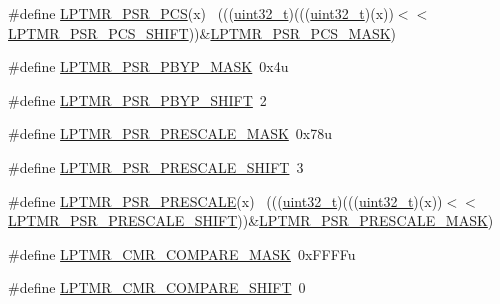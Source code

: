 \begin{DoxyCompactItemize}
\#define \hyperlink{group___l_p_t_m_r___register___masks_ga6b5b85beaa5760eaa1b5e0fd252bf9a2}{L\+P\+T\+M\+R\+\_\+\+P\+S\+R\+\_\+\+P\+CS}(x)                                              ~(((\hyperlink{_p_e___types_8h_a33594304e786b158f3fb30289278f5af}{uint32\+\_\+t})(((\hyperlink{_p_e___types_8h_a33594304e786b158f3fb30289278f5af}{uint32\+\_\+t})(x))$<$$<$\hyperlink{group___l_p_t_m_r___register___masks_gaf258bce874ad60601d6d76cefc72c52e}{L\+P\+T\+M\+R\+\_\+\+P\+S\+R\+\_\+\+P\+C\+S\+\_\+\+S\+H\+I\+FT}))\&\hyperlink{group___l_p_t_m_r___register___masks_ga40daa10db43ec0c0a1944e6289ca29cc}{L\+P\+T\+M\+R\+\_\+\+P\+S\+R\+\_\+\+P\+C\+S\+\_\+\+M\+A\+SK})
\item 
\#define \hyperlink{group___l_p_t_m_r___register___masks_gab3daae6085cf702b31db5be78fe03872}{L\+P\+T\+M\+R\+\_\+\+P\+S\+R\+\_\+\+P\+B\+Y\+P\+\_\+\+M\+A\+SK}~0x4u
\item 
\#define \hyperlink{group___l_p_t_m_r___register___masks_ga4bb5021e396db697f5e597fdcdc222e3}{L\+P\+T\+M\+R\+\_\+\+P\+S\+R\+\_\+\+P\+B\+Y\+P\+\_\+\+S\+H\+I\+FT}~2
\item 
\#define \hyperlink{group___l_p_t_m_r___register___masks_ga93a6fe3fb169a73716a837cedb92dbef}{L\+P\+T\+M\+R\+\_\+\+P\+S\+R\+\_\+\+P\+R\+E\+S\+C\+A\+L\+E\+\_\+\+M\+A\+SK}~0x78u
\item 
\#define \hyperlink{group___l_p_t_m_r___register___masks_ga7ed76902e13634d0c543ade3ef47525a}{L\+P\+T\+M\+R\+\_\+\+P\+S\+R\+\_\+\+P\+R\+E\+S\+C\+A\+L\+E\+\_\+\+S\+H\+I\+FT}~3
\item 
\#define \hyperlink{group___l_p_t_m_r___register___masks_gaeb71c6e1dd5200d74099db29087a59e3}{L\+P\+T\+M\+R\+\_\+\+P\+S\+R\+\_\+\+P\+R\+E\+S\+C\+A\+LE}(x)                                    ~(((\hyperlink{_p_e___types_8h_a33594304e786b158f3fb30289278f5af}{uint32\+\_\+t})(((\hyperlink{_p_e___types_8h_a33594304e786b158f3fb30289278f5af}{uint32\+\_\+t})(x))$<$$<$\hyperlink{group___l_p_t_m_r___register___masks_ga7ed76902e13634d0c543ade3ef47525a}{L\+P\+T\+M\+R\+\_\+\+P\+S\+R\+\_\+\+P\+R\+E\+S\+C\+A\+L\+E\+\_\+\+S\+H\+I\+FT}))\&\hyperlink{group___l_p_t_m_r___register___masks_ga93a6fe3fb169a73716a837cedb92dbef}{L\+P\+T\+M\+R\+\_\+\+P\+S\+R\+\_\+\+P\+R\+E\+S\+C\+A\+L\+E\+\_\+\+M\+A\+SK})
\item 
\#define \hyperlink{group___l_p_t_m_r___register___masks_ga55cc95c022500b353f1724f2cbfe7a8f}{L\+P\+T\+M\+R\+\_\+\+C\+M\+R\+\_\+\+C\+O\+M\+P\+A\+R\+E\+\_\+\+M\+A\+SK}~0x\+F\+F\+F\+Fu
\item 
\#define \hyperlink{group___l_p_t_m_r___register___masks_gae1a525e22dc8b9c6960ae2e859a64232}{L\+P\+T\+M\+R\+\_\+\+C\+M\+R\+\_\+\+C\+O\+M\+P\+A\+R\+E\+\_\+\+S\+H\+I\+FT}~0

\end{DoxyCompactItemize}
